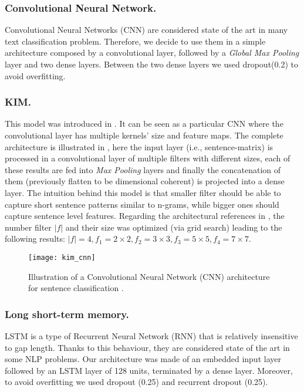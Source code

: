 \subsubsection{Convolutional Neural Network.}
Convolutional Neural Networks (CNN) are considered state of the art in many text classification problem. Therefore, we decide to use them in a simple architecture composed by a convolutional layer, followed by a \emph{Global Max Pooling} layer and two dense layers.
Between the two dense layers we used dropout(0.2) to avoid overfitting.

\subsubsection{KIM.}
This model was introduced in \cite{kim2014convolutional}. It can be seen as a particular CNN where the convolutional layer has multiple kernels' size and feature maps.
The complete architecture is illustrated in , here the input layer (i.e., sentence-matrix) is processed in a convolutional layer of multiple filters with different sizes, each of these results are fed into \emph{Max Pooling} layers and finally the concatenation of them (previously flatten to be dimensional coherent) is projected into a dense layer.
The intuition behind this model is that smaller filter should be able to capture short sentence patterns similar to n-grams, while bigger ones should capture sentence level features.
Regarding the architectural references in \cite{kim2014convolutional}, the number filter $|f|$ and their size was optimized (via grid search) leading to the following results: $|f| = 4, f_1 = 2\times2, f_2 = 3\times3, f_3 = 5\times5, f_4 = 7\times7$.

\begin{figure}[h]
\footnotesize
\centering
\texttt{[image: kim\_cnn]}
\caption{Illustration of a Convolutional Neural Network (CNN) architecture for sentence classification \cite{zhang2015sensitivity}.}
\label{fig:kim}
\end{figure}

\subsubsection{Long short-term memory.}
LSTM is a type of Recurrent Neural Network (RNN) that is relatively insensitive to gap length. Thanks to this behaviour, they are considered state of the art in some NLP problems.
Our architecture was made of an embedded input layer followed by an LSTM layer of 128 units, terminated by a dense layer. Moreover, to avoid overfitting we used dropout (0.25) and recurrent dropout (0.25).

